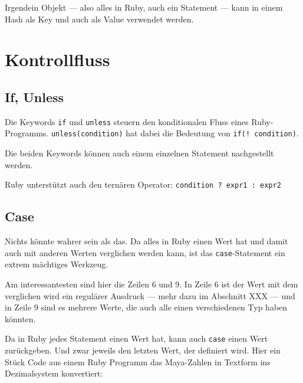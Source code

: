 \documentclass[a4book,11pt,twoside]{scrbook}
\begin{document}
Irgendein Objekt — also alles in Ruby, auch ein Statement — kann in einem Hash als Key und auch als Value verwendet werden.









\section{Kontrollfluss} %
\label{sec:kontrollfluss}

\subsection*{If, Unless} %
\label{ssub:if_unless}
Die Keywords \texttt{if} und \texttt{unless} steuern den konditionalen Fluss eines Ruby-Programms. \texttt{unless(condition)} hat dabei die Bedeutung von \texttt{if(! condition)}.

Die beiden Keywords können auch einem einzelnen Statement nachgestellt werden.



Ruby unterstützt auch den ternären Operator: \texttt{condition ? expr1 : expr2}


\subsection*{Case} %
\label{sub:case}
\begin{quotation}
\end{quotation}

Nichts könnte wahrer sein als das. Da alles in Ruby einen Wert hat und damit auch mit anderen Werten verglichen werden kann, ist das \texttt{case}-Statement ein extrem mächtiges Werkzeug.



Am interessantesten sind hier die Zeilen 6 und 9. In Zeile 6 ist der Wert mit dem verglichen wird ein regulärer Ausdruck — mehr dazu im Abschnitt XXX — und in Zeile 9 sind es mehrere Werte, die auch alle einen verschiedenen Typ haben könnten.


Da in Ruby jedes Statement einen Wert hat, kann auch \texttt{case} einen Wert zurückgeben. Und zwar jeweils den letzten Wert, der definiert wird. Hier ein Stück Code aus einem Ruby Programm das Maya-Zahlen in Textform ins Dezimalsystem konvertiert:
\end{document}
